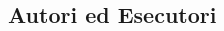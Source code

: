 \documentclass[8pt, twoside, a5paper]{extreport}
\begin{document}
\bigskip

\begin{multicols}{2}




\end{multicols}

\clearpage

\section*{ }

\subsection*{\textsf{Autori ed Esecutori}\\}

{\fontsize{30}{30} }

\bigskip

\begin{multicols}{2}




\end{multicols}

\clearpage

\section*{ }



\begin{center}



\end{center}


\end{document}
